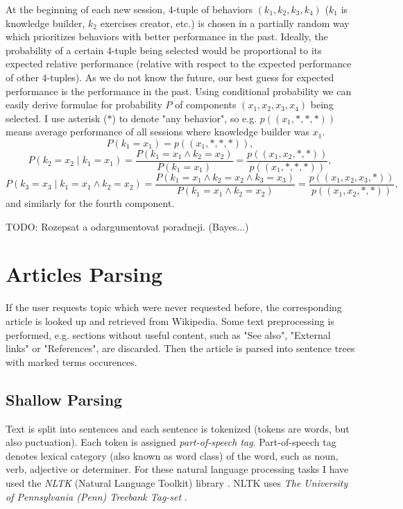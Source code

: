 \documentclass[a4paper, 12pt, twoside]{fithesis2}		%
\renewcommand{\_}{\leavevmode \kern0.0em\vbox{\hrule width0.4em}}
\begin{document}
At the beginning of each new session, 4-tuple of behaviors $(k_1, k_2, k_3, k_4)$ ($k_1$ is knowledge builder, $k_2$ exercises creator, etc.) is chosen in a partially random way
which prioritizes behaviors with better performance in the past.
Ideally, the probability of a certain 4-tuple being selected would be proportional to its expected relative performance
(relative with respect to the expected performance of other 4-tuples).
As we do not know the future, our best guess for expected performance is the performance in the past.
Using conditional probability we can easily derive formulae for probability $P$ of components $(x_1, x_2, x_3, x_4)$ being selected.
I use asterisk ($*$) to denote "any behavior", so e.g. $p((x_1, *, *, *))$ means average performance of all sessions where knowledge builder was $x_1$.
$$
P(k_1 = x_1) = p((x_1, *, *, *)),
$$
$$
P(k_2 = x_2 \mid k_1 = x_1)
  = \frac{P(k_1 = x_1 \land k_2 = x_2)}{P(k_1 = x_1)}
  = \frac{p((x_1, x_2, *, *))}{p((x_1, *, *, *))},
$$
$$
P(k_3 = x_3 \mid k_1 = x_1 \land k_2 = x_2)
  = \frac{P(k_1 = x_1 \land k_2 = x_2 \land k_3 = x_3)}{P(k_1 = x_1 \land k_2 = x_2)}
  = \frac{p((x_1, x_2, x_3, *))}{p((x_1, x_2, *, *))},
$$
and similarly for the fourth component.



TODO: Rozepsat a odargumentovat poradneji. (Bayes...)


\section{Articles Parsing}

If the user requests topic which were never requested before,
the corresponding article is looked up and retrieved from Wikipedia.
Some text preprocessing is performed, e.g. sections without useful content, such as "See also", "External links" or "References", are discarded.
Then the article is parsed into sentence trees with marked terms occurences.

\subsection*{Shallow Parsing}
Text is split into sentences and each sentence is tokenized (tokens are words, but also puctuation).
    Each token is assigned \textit{part-of-speech tag}.
    Part-of-speech tag denotes lexical category (also known as word class) of the word, such as noun, verb, adjective or determiner.
    For these natural language processing tasks I have used the \textit{NLTK} (Natural Language Toolkit) library \cite{nlp-python}. NLTK uses \textit{The University of Pennsylvania (Penn) Treebank Tag-set} \cite{penn-tagset}.
\end{document}
